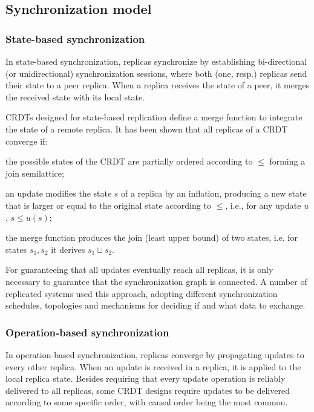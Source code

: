 \documentclass[12pt]{article}
\begin{document}
\subsection{Synchronization model}

\subsubsection{State-based synchronization}\label{sec:sysdev:state}
In state-based synchronization, replicas synchronize by establishing bi-direc\-tional (or
unidirectional) synchronization sessions, where both (one, resp.) replicas send
their state to a peer replica. 
When a replica receives the state of a peer, it merges the received state with 
its local state.

CRDTs designed for state-based replication define a merge function to 
integrate the state of a remote replica.
It has been shown \cite{Shapiro11Conflict} that all replicas of a CRDT converge if: 
\begin{inparaenum}[(i)] 
\item the possible states of the CRDT are partially ordered according to $\leq$ forming a 
join semilattice;
\item an update modifies the state $s$ of a replica by an inflation, producing a new state that is
larger or equal to the original state according to $\leq$, 
  i.e., for any update $u$, $s \leq u(s)$;
\item the merge function produces the join (least upper bound) of two states, 
i.e. for states $s_1,s_2$ it derives $s_1 \sqcup s_2$. 
\end{inparaenum}

For guaranteeing that all updates eventually reach all replicas, it is only necessary 
to guarantee that the synchronization graph is connected.
A number of replicated systems \cite{lotusnotes,Ratner99Peer,dynamo} used this approach,
adopting different synchronization schedules, topologies and mechanisms 
for deciding if and what data to exchange.

\subsubsection{Operation-based synchronization}

In operation-based synchronization, replicas converge by propagating updates 
to every other replica.
When an update is received in a replica, it is applied to the local replica
state.
Besides requiring that every update operation is reliably delivered to all replicas,
some CRDT designs require updates to be delivered according to some specific order,
with causal order being the most common.
\end{document}
